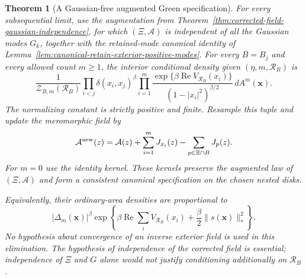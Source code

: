 \documentclass[11pt,a4paper]{article}
\numberwithin{equation}{section}
\newtheorem{theorem}{Theorem}[section]
\theoremstyle{definition}
\theoremstyle{remark}
\begin{document}
\begin{theorem}[A Gaussian-free augmented Green specification]
\label{thm:gaussian-free-green-specification}
For every subsequential limit, use the augmentation from
Theorem~\ref{thm:corrected-field-gaussian-independence}, for which
$(\Xi,\mathcal A)$ is independent of all the Gaussian modes $G_k$,
together with the retained-mode canonical identity of
Lemma~\ref{lem:canonical-retain-exterior-positive-modes}.
For every $B=B_j$ and every allowed count $m\ge1$, the interior
conditional density given
$(\eta,m,\mathcal R_B)$ is
\begin{equation}\label{eq:gaussian-free-green-kernel}
 \frac1{\mathcal Z_{B,m}(\mathcal R_B)}
 \prod_{i<j}\delta(x_i,x_j)^\beta
 \prod_{i=1}^m
    \frac{\exp\{\beta\operatorname{Re}V_{\mathcal R_B}(x_i)\}}
         {(1-|x_i|^2)^{\beta/2}}\,dA^m(\mathbf x).
\end{equation}
The normalizing constant is strictly positive and finite. Resample
this tuple and update the meromorphic field by
\begin{equation}\label{eq:gaussian-free-A-resampling}
 \mathcal A^{\rm new}(z)=\mathcal A(z)
   +\sum_{i=1}^m J_{x_i}(z)-\sum_{p\in\Xi\cap B}J_p(z).
\end{equation}
For $m=0$ use the identity kernel. These kernels preserve the
augmented law of $(\Xi,\mathcal A)$ and form a consistent canonical
specification on the chosen nested disks.

Equivalently, their ordinary-area densities are proportional to
\begin{equation}\label{eq:gaussian-elimination-moment-norm}
 |\Delta_m(\mathbf x)|^\beta
 \exp\left\{\beta\operatorname{Re}\sum_i V_{\mathcal R_B}(x_i)
                  +\frac\beta2\|s(\mathbf x)\|_*^2\right\}.
\end{equation}
No hypothesis about convergence of an inverse exterior field is used
in this elimination. The hypothesis of independence of the corrected
field is essential; independence of $\Xi$ and $G$ alone would not
justify conditioning additionally on $\mathcal R_B$.
\end{theorem}
\end{document}
